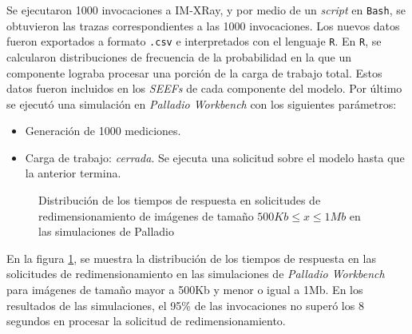 Se ejecutaron 1000 invocaciones a IM-XRay, y por medio de un \emph{script} en \texttt{Bash}, se obtuvieron las trazas correspondientes a las 1000 invocaciones. Los nuevos datos fueron exportados a formato \texttt{.csv} e interpretados con el lenguaje \texttt{R}. En \texttt{R}, se calcularon distribuciones de frecuencia de la probabilidad en la que un componente lograba procesar una porción de la carga de trabajo total. Estos datos fueron incluidos en los \emph{SEEFs} de cada componente del modelo. Por último se ejecutó una simulación en \emph{Palladio Workbench} con los siguientes parámetros:
\begin{itemize}
    \item Generación de 1000 mediciones.
    \item Carga de trabajo: \emph{cerrada}. Se ejecuta una solicitud sobre el modelo hasta que la anterior termina. 
\end{itemize}

\hspace{-3.0cm}
\begin{figure}
\caption{Distribución de los tiempos de respuesta en solicitudes de redimensionamiento de imágenes de tamaño $500Kb \leq x \leq 1Mb$ en las simulaciones de Palladio}
\label{fig:distribucion-simulacion-imagenes-hasta-1mb}
\end{figure}

En la figura \ref{fig:distribucion-simulacion-imagenes-hasta-1mb}, se muestra la distribución de los tiempos de respuesta en las solicitudes de redimensionamiento en las simulaciones de \emph{Palladio Workbench} para imágenes de tamaño mayor a 500Kb y menor o igual a 1Mb. En los resultados de las simulaciones, el 95\% de las invocaciones no superó los 8 segundos en procesar la solicitud de redimensionamiento.

